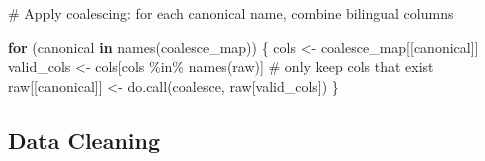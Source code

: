 \documentclass[
  letterpaper,
  DIV=11,
  numbers=noendperiod]{scrartcl}
\newenvironment{Shaded}{\begin{snugshade}}{\end{snugshade}}
\newcommand{\CommentTok}[1]{\textcolor[rgb]{0.37,0.37,0.37}{#1}}
\newcommand{\ControlFlowTok}[1]{\textcolor[rgb]{0.00,0.23,0.31}{\textbf{#1}}}
\newcommand{\FunctionTok}[1]{\textcolor[rgb]{0.28,0.35,0.67}{#1}}
\newcommand{\NormalTok}[1]{\textcolor[rgb]{0.00,0.23,0.31}{#1}}
\newcommand{\OtherTok}[1]{\textcolor[rgb]{0.00,0.23,0.31}{#1}}
\newcommand{\SpecialCharTok}[1]{\textcolor[rgb]{0.37,0.37,0.37}{#1}}
\begin{document}
\begin{Shaded}
\begin{Highlighting}[]
\CommentTok{\# Apply coalescing: for each canonical name, combine bilingual columns}

\ControlFlowTok{for}\NormalTok{ (canonical }\ControlFlowTok{in} \FunctionTok{names}\NormalTok{(coalesce\_map)) \{}
\NormalTok{  cols }\OtherTok{\textless{}{-}}\NormalTok{ coalesce\_map[[canonical]]}
\NormalTok{  valid\_cols  }\OtherTok{\textless{}{-}}\NormalTok{ cols[cols }\SpecialCharTok{\%in\%} \FunctionTok{names}\NormalTok{(raw)]          }\CommentTok{\# only keep cols that exist}
\NormalTok{  raw[[canonical]] }\OtherTok{\textless{}{-}} \FunctionTok{do.call}\NormalTok{(coalesce, raw[valid\_cols])}
\NormalTok{\}}
\end{Highlighting}
\end{Shaded}

\subsection{Data Cleaning}\label{data-cleaning}
\end{document}
